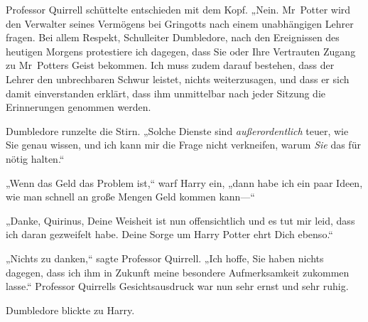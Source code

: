 Professor Quirrell schüttelte entschieden mit dem Kopf. „Nein. Mr~Potter wird den Verwalter seines Vermögens bei Gringotts nach einem unabhängigen Lehrer fragen. Bei allem Respekt, Schulleiter Dumbledore, nach den Ereignissen des heutigen Morgens protestiere ich dagegen, dass Sie oder Ihre Vertrauten Zugang zu Mr~Potters Geist bekommen. Ich muss zudem darauf bestehen, dass der Lehrer den unbrechbaren Schwur leistet, nichts weiterzusagen, und dass er sich damit einverstanden erklärt, dass ihm unmittelbar nach jeder Sitzung die Erinnerungen genommen werden.

Dumbledore runzelte die Stirn. „Solche Dienste sind \emph{außerordentlich} teuer, wie Sie genau wissen, und ich kann mir die Frage nicht verkneifen, warum \emph{Sie} das für nötig halten.“

„Wenn das Geld das Problem ist,“ warf Harry ein, „dann habe ich ein paar Ideen, wie man schnell an große Mengen Geld kommen kann—“

„Danke, Quirinus, Deine Weisheit ist nun offensichtlich und es tut mir leid, dass ich daran gezweifelt habe. Deine Sorge um Harry Potter ehrt Dich ebenso.“

„Nichts zu danken,“ sagte Professor Quirrell. „Ich hoffe, Sie haben nichts dagegen, dass ich ihm in Zukunft meine besondere Aufmerksamkeit zukommen lasse.“ Professor Quirrells Gesichtsausdruck war nun sehr ernst und sehr ruhig.

Dumbledore blickte zu Harry.

